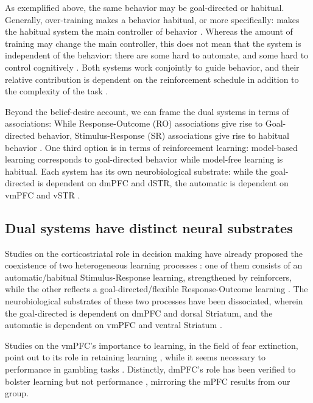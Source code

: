         As exemplified above, the same behavior may be goal-directed or habitual. Generally, over-training makes a behavior habitual, or more specifically: makes the habitual system the main controller of behavior \cite{}. Whereas the amount of training may change the main controller, this does not mean that the system is independent of the behavior: there are some hard to automate, and some hard to control cognitively \cite{}. Both systems work conjointly to guide behavior, and their relative contribution is dependent on the reinforcement schedule in addition to the complexity of the task \cite{dickinson2015instrumental}.
        
        Beyond the belief-desire account, we can frame the dual systems in terms of associations: While Response-Outcome (RO) associations give rise to Goal-directed behavior, Stimulus-Response (SR) associations give rise to habitual behavior \cite{}. One third option is in terms of reinforcement learning: model-based learning corresponds to goal-directed behavior while model-free learning is habitual. 
        Each system has its own neurobiological substrate: while the goal-directed is dependent on dmPFC and dSTR, the automatic is dependent on vmPFC and vSTR \cite{dickinson2015instrumental}. 

    \subsection{Dual systems have distinct neural substrates}
        Studies on the corticostriatal role in decision making have already proposed the coexistence of two heterogeneous learning processes \cite{balleine1998goal, balleine2007role, smith2013dual}: one of them consists of an automatic/habitual Stimulus-Response learning, strengthened by reinforcers, while the other reflects a goal-directed/flexible Response-Outcome learning \cite{dickinson2015instrumental}. The neurobiological substrates of these two processes have been dissociated, wherein the goal-directed is dependent on dmPFC and dorsal Striatum, and the automatic is dependent on vmPFC and ventral Striatum \cite{dickinson2015instrumental}.

        Studies on the vmPFC's importance to learning, in the field of fear extinction, point out to its role in retaining learning \cite{phelps2004extinction}, while it seems necessary to performance in gambling tasks \cite{rogalsky2012risky}. Distinctly, dmPFC's role has been verified to bolster learning but not performance \cite{balleine2007still}, mirroring the mPFC results from our group.


